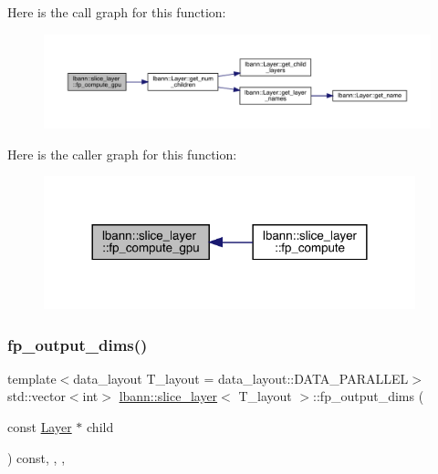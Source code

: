 Here is the call graph for this function\+:\nopagebreak
\begin{figure}[H]
\begin{center}
\leavevmode
\includegraphics[width=350pt]{classlbann_1_1slice__layer_a875347929b9e4c0a70749da0dbb6469e_cgraph}
\end{center}
\end{figure}
Here is the caller graph for this function\+:\nopagebreak
\begin{figure}[H]
\begin{center}
\leavevmode
\includegraphics[width=305pt]{classlbann_1_1slice__layer_a875347929b9e4c0a70749da0dbb6469e_icgraph}
\end{center}
\end{figure}
\mbox{\label{classlbann_1_1slice__layer_a086c918fe72f28248f987d6a3aef355d}} 
\subsubsection{\texorpdfstring{fp\+\_\+output\+\_\+dims()}{fp\_output\_dims()}}
{\footnotesize\ttfamily template$<$data\+\_\+layout T\+\_\+layout = data\+\_\+layout\+::\+D\+A\+T\+A\+\_\+\+P\+A\+R\+A\+L\+L\+EL$>$ \\
std\+::vector$<$int$>$ \hyperlink{classlbann_1_1slice__layer}{lbann\+::slice\+\_\+layer}$<$ T\+\_\+layout $>$\+::fp\+\_\+output\+\_\+dims (\begin{DoxyParamCaption}\item[{const \hyperlink{classlbann_1_1Layer}{Layer} $\ast$}]{child }\end{DoxyParamCaption}) const\hspace{0.3cm}{\ttfamily [inline]}, {\ttfamily [override]}, {\ttfamily [protected]}, {\ttfamily [virtual]}}


